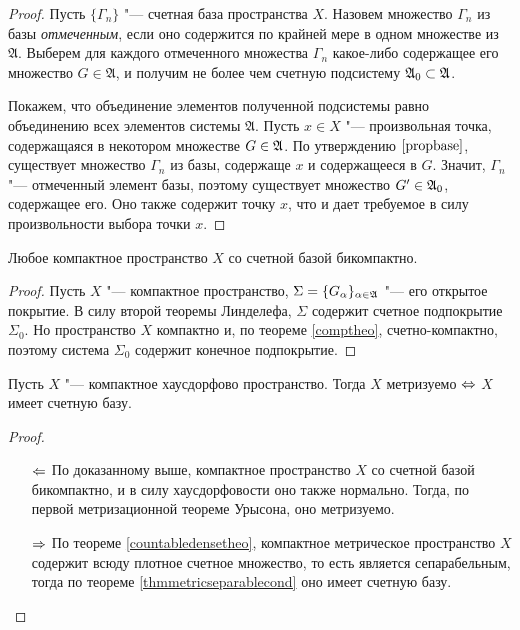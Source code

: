 \begin{proof}
    Пусть $\{\Gamma_n\}$ "--- счетная база пространства $X$. Назовем множество $\Gamma_n$ из базы \textit{отмеченным}, если оно содержится по крайней мере в одном множестве из $\mathfrak{A}$. Выберем для каждого отмеченного множества $\Gamma_n$ какое-либо содержащее его множество $G \in \mathfrak{A}$, и получим не более чем счетную подсистему $\mathfrak A_0 \subset \mathfrak A$.
    
    Покажем, что объединение элементов полученной подсистемы равно объединению всех элементов системы $\mathfrak{A}$. Пусть $x \in X$ "--- произвольная точка, содержащаяся в некотором множестве $G \in \mathfrak A$. По утверждению $\ref{propbase}$, существует множество $\Gamma_n$ из базы, содержаще $x$ и содержащееся в $G$. Значит, $\Gamma_n$ "--- отмеченный элемент базы, поэтому существует множество $G' \in \mathfrak A_0$, содержащее его. Оно также содержит точку $x$, что и дает требуемое в силу произвольности выбора точки $x$.
\end{proof}

\begin{corollary}
    Любое компактное пространство $X$ со счетной базой бикомпактно.
\end{corollary}

\begin{proof}
    Пусть $X$ "--- компактное пространство, $\Sigma = \lbrace G_{\alpha}\rbrace_{\alpha \in \mathfrak A}$ "--- его открытое покрытие. В силу второй теоремы Линделефа, $\Sigma$ содержит счетное подпокрытие $\Sigma_0$. Но пространство $X$ компактно и, по теореме \ref{comptheo}, счетно-компактно, поэтому система $\Sigma_0$ содержит конечное подпокрытие.
\end{proof}

\begin{theorem}
    Пусть $X$ "--- компактное хаусдорфово пространство. Тогда $X$ метризуемо $\Leftrightarrow$ $X$ имеет счетную базу.
\end{theorem}

\begin{proof}~
    \begin{itemize}
        \item[$\Leftarrow$] По доказанному выше, компактное пространство $X$ со счетной базой бикомпактно, и в силу хаусдорфовости оно также нормально. Тогда, по первой метризационной теореме Урысона, оно метризуемо.

        \item[$\Rightarrow$] По теореме \ref{countabledensetheo}, компактное метрическое пространство $X$ содержит всюду плотное счетное множество, то есть является сепарабельным, тогда по теореме \ref{thmmetricseparablecond} оно имеет счетную базу.\qedhere
    \end{itemize}
\end{proof}

